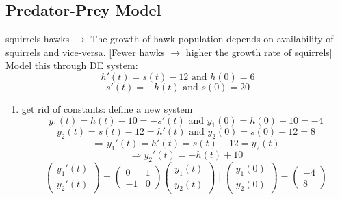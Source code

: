 \documentclass{article}
\begin{document}
\subsection{Predator-Prey Model}
squirrels-hawks $\rightarrow$ The growth of hawk population depends on availability of squirrels and vice-versa. [Fewer hawks $\rightarrow$ higher the growth rate of squirrels]
\\ Model this through DE system:
\begin{equation*} h'(t) = s(t) - 12 \text{ and } h(0) = 6\end{equation*}
\begin{equation*} s'(t) = -h(t) \text{  and  } s(0) = 20 \end{equation*}
\begin{enumerate} 
    \item \underline{get rid of constants:} define a new system \\
    \begin{equation*} y_1(t) = h(t) - 10 = -s'(t) \text{    and    } y_1(0) = h(0) - 10 = -4\end{equation*}
    \begin{equation*} y_2(t) = s(t) - 12 = h'(t) \text{   and   }  y_2(0) = s(0) - 12 = 8 \end{equation*}
    \begin{equation*} \Rightarrow y_1'(t) = h'(t) = s(t) - 12 = y_2(t)  \end{equation*}
    \begin{equation*} \Rightarrow y_2'(t) = -h(t) + 10 \end{equation*} 
    \begin{equation*} \begin{pmatrix} y_1'(t) \\ y_2'(t) \end{pmatrix} = \begin{pmatrix} 0 & 1 \\ -1 & 0 \end{pmatrix} \begin{pmatrix} y_1(t) \\ y_2(t) \end{pmatrix} \mid \begin{pmatrix} y_1(0) \\ y_2(0) \end{pmatrix} = \begin{pmatrix} -4 \\ 8 \end{pmatrix} \end{equation*} 

\end{enumerate}
\end{document}

